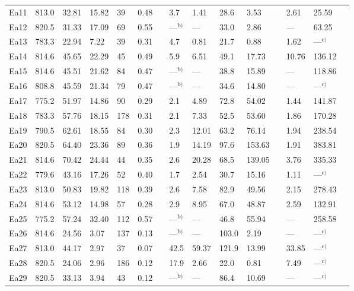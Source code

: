 \documentclass[12pt,onecolumn]{article}
\begin{document}
\begin{bibunit}
\begin{table}
{\begin{threeparttable}[t]
\begin{tabular}{rllllllllllllll}
Ea11 & 813.0 & 32.81 & 15.82 &   39 & 0.48 &  &  3.7 & 1.41 & 28.6 & 3.53 &  & 2.61 &25.59 \\ 
Ea12 & 820.5 & 31.33 & 17.09 &   69 & 0.55 &  & ---$^\text{b)}$ & --- &33.0 & 2.86 & & --- &63.25 \\ 
Ea13 & 783.3 & 22.94 & 7.22 &   39 & 0.31 &  &  4.7 & 0.81 & 21.7 & 0.88 &  & 1.62 &---$^\text{c)}$\\ 
Ea14 & 814.6 & 45.65 & 22.29 &   45 & 0.49 &  &  5.9 & 6.51 & 49.1 & 17.73 &  & 10.76 &136.12 \\ 
Ea15 & 814.6 & 45.51 & 21.62 &   84 & 0.47 &  & ---$^\text{b)}$ & --- &38.8 & 15.89 & & --- &118.86 \\ 
Ea16 & 808.8 & 45.59 & 21.34 &   79 & 0.47 &  & ---$^\text{b)}$ & --- &34.6 & 14.80 & & --- &---$^\text{c)}$\\ 
Ea17 & 775.2 & 51.97 & 14.86 &   90 & 0.29 &  &  2.1 & 4.89 & 72.8 & 54.02 &  & 1.44 &141.87 \\ 
Ea18 & 783.3 & 57.76 & 18.15 &  178 & 0.31 &  &  2.1 & 7.33 & 52.5 & 53.60 &  & 1.86 &170.28 \\ 
Ea19 & 790.5 & 62.61 & 18.55 &   84 & 0.30 &  &  2.3 & 12.01 & 63.2 & 76.14 &  & 1.94 &238.54 \\ 
Ea20 & 820.5 & 64.40 & 23.36 &   89 & 0.36 &  &  1.9 & 14.19 & 97.6 & 153.63 &  & 1.91 &383.81 \\ 
Ea21 & 814.6 & 70.42 & 24.44 &   44 & 0.35 &  &  2.6 & 20.28 & 68.5 & 139.05 &  & 3.76 &335.33 \\ 
Ea22 & 779.6 & 43.16 & 17.26 &   52 & 0.40 &  &  1.7 & 2.54 & 30.7 & 15.16 &  & 1.11 &---$^\text{c)}$\\ 
Ea23 & 813.0 & 50.83 & 19.82 &  118 & 0.39 &  &  2.6 & 7.58 & 82.9 & 49.56 &  & 2.15 &278.43 \\ 
Ea24 & 814.6 & 53.12 & 14.98 &   57 & 0.28 &  &  2.9 & 8.95 & 67.0 & 48.87 &  & 2.59 &132.91 \\ 
Ea25 & 775.2 & 57.24 & 32.40 &  112 & 0.57 &  & ---$^\text{b)}$ & --- &46.8 & 55.94 & & --- &258.58 \\ 
Ea26 & 814.6 & 24.56 & 3.07 &  137 & 0.13 &  & ---$^\text{b)}$ & --- &103.0 & 2.19 &  & --- &---$^\text{c)}$\\ 
Ea27 & 813.0 & 44.17 & 2.97 &   37 & 0.07 &  & 42.5 & 59.37 & 121.9 & 13.99 &  & 33.85 &---$^\text{c)}$\\ 
Ea28 & 820.5 & 24.06 & 2.96 &  186 & 0.12 &  & 17.9 & 2.66 & 22.0 & 0.81 &  & 7.49 &---$^\text{c)}$\\ 
Ea29 & 820.5 & 33.13 & 3.94 &   43 & 0.12 &  & ---$^\text{b)}$ & --- &86.4 & 10.69 &  & --- &---$^\text{c)}$\\ 

\end{tabular}
\end{threeparttable}}
\end{table}
\end{bibunit}
\end{document}
